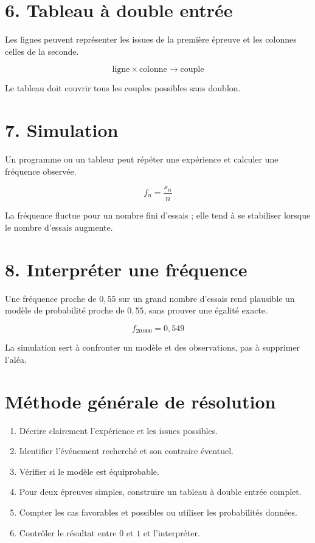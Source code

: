 \section{6. Tableau à double entrée}
Les lignes peuvent représenter les issues de la première épreuve et les colonnes celles de la seconde.

\[
\text{ligne}\times\text{colonne}\rightarrow\text{couple}
\]

\begin{exemple}
Le tableau doit couvrir tous les couples possibles sans doublon.
\end{exemple}

\section{7. Simulation}
Un programme ou un tableur peut répéter une expérience et calculer une fréquence observée.

\[
f_n=\dfrac{s_n}{n}
\]

\begin{exemple}
La fréquence fluctue pour un nombre fini d’essais ; elle tend à se stabiliser lorsque le nombre d’essais augmente.
\end{exemple}

\section{8. Interpréter une fréquence}
Une fréquence proche de $0{,}55$ sur un grand nombre d’essais rend plausible un modèle de probabilité proche de $0{,}55$, sans prouver une égalité exacte.

\[
f_{20\,000}=0{,}549
\]

\begin{exemple}
La simulation sert à confronter un modèle et des observations, pas à supprimer l’aléa.
\end{exemple}

\section{Méthode générale de résolution}
\begin{methode}
\begin{enumerate}
\item Décrire clairement l’expérience et les issues possibles.
\item Identifier l’événement recherché et son contraire éventuel.
\item Vérifier si le modèle est équiprobable.
\item Pour deux épreuves simples, construire un tableau à double entrée complet.
\item Compter les cas favorables et possibles ou utiliser les probabilités données.
\item Contrôler le résultat entre $0$ et $1$ et l’interpréter.
\end{enumerate}
\end{methode}

